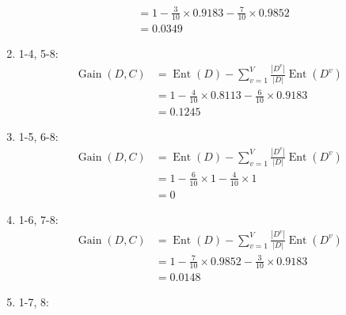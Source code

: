 \documentclass[UTF8,a4paper,AutoFakeBold,AutoFakeSlant]{article}
\begin{document}
\begin{enumerate}
\begin{equation*}
\begin{aligned}
                                     & = 1 - \frac{3}{10}\times 0.9183 - \frac{7}{10}\times 0.9852                                                \\
                                     & = 0.0349
          \end{aligned}
        \end{equation*}
  \item 1-4, 5-8:
        \begin{equation*}
          \begin{aligned}
            \operatorname{Gain}(D,C) & = \operatorname{Ent}(D)-\sum_{v=1}^{V} \frac{\left|D^{v}\right|}{|D|} \operatorname{Ent}\left(D^{v}\right) \\
                                     & = 1 - \frac{4}{10}\times 0.8113 - \frac{6}{10}\times 0.9183                                                \\
                                     & = 0.1245
          \end{aligned}
        \end{equation*}
  \item 1-5, 6-8:
        \begin{equation*}
          \begin{aligned}
            \operatorname{Gain}(D,C) & = \operatorname{Ent}(D)-\sum_{v=1}^{V} \frac{\left|D^{v}\right|}{|D|} \operatorname{Ent}\left(D^{v}\right) \\
                                     & = 1 - \frac{6}{10}\times 1 - \frac{4}{10}\times 1                                                          \\
                                     & = 0
          \end{aligned}
        \end{equation*}
  \item 1-6, 7-8:
        \begin{equation*}
          \begin{aligned}
            \operatorname{Gain}(D,C) & = \operatorname{Ent}(D)-\sum_{v=1}^{V} \frac{\left|D^{v}\right|}{|D|} \operatorname{Ent}\left(D^{v}\right) \\
                                     & = 1 - \frac{7}{10}\times 0.9852 - \frac{3}{10}\times 0.9183                                                \\
                                     & = 0.0148
          \end{aligned}
        \end{equation*}
  \item 1-7, 8:

\end{enumerate}
\end{document}

